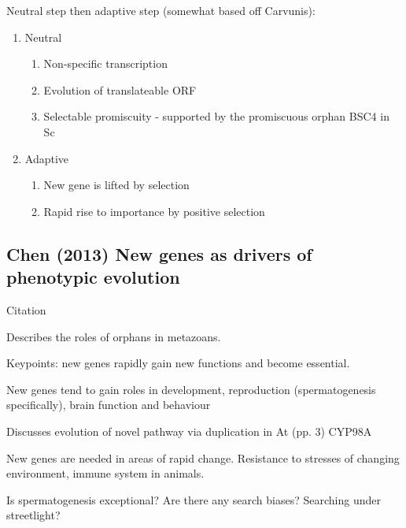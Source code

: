     Neutral step then adaptive step (somewhat based off Carvunis):
\begin{enumerate}
    
    \item Neutral
    
        \begin{enumerate}
            
            \item Non-specific transcription
            \item Evolution of translateable ORF
            \item Selectable promiscuity - supported by the promiscuous
                orphan BSC4 in Sc \cite{cai_novo_2008}

        \end{enumerate}
        
    \item Adaptive
    
        \begin{enumerate}
            
            \item New gene is lifted by selection
            \item Rapid rise to importance by positive selection
        
        \end{enumerate}

\end{enumerate}

\subsection{Chen (2013) New genes as drivers of phenotypic evolution}

    Citation \cite{chen_new_2013}

    Describes the roles of orphans in metazoans.

    Keypoints: new genes rapidly gain new functions and become essential.

    New genes tend to gain roles in development, reproduction
    (spermatogenesis specifically), brain function and behaviour

    Discusses evolution of novel pathway via duplication in At (pp. 3)
    CYP98A

    New genes are needed in areas of rapid change. Resistance to stresses
    of changing environment, immune system in animals.

    Is spermatogenesis exceptional? Are there any search biases? Searching
    under streetlight?

